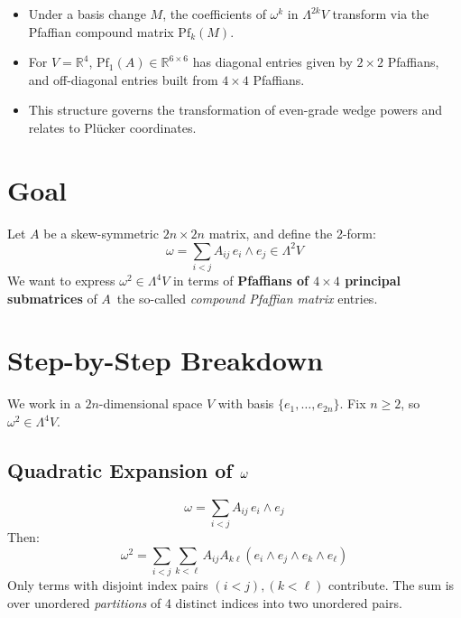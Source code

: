 \documentclass[aps,prd,onecolumn,notitlepage,nofootinbib]{revtex4-2}
\begin{document}
\begin{itemize}
\item Under a basis change $M$, the coefficients of $\omega ^{k}$ in $%
\Lambda ^{2k}V$ transform via the Pfaffian compound matrix $\mathrm{Pf}%
_{k}(M)$.

\item For $V=\mathbb{R}^{4}$, $\mathrm{Pf}_{1}(A)\in \mathbb{R}^{6\times 6}$
has diagonal entries given by $2\times 2$ Pfaffians, and off-diagonal
entries built from $4\times 4$ Pfaffians.

\item This structure governs the transformation of even-grade wedge powers
and relates to Pl\"{u}cker coordinates.
\end{itemize}

\section{Goal}

Let $A$ be a skew-symmetric $2n\times 2n$ matrix, and define the 2-form: 
\begin{equation*}
\omega =\sum_{i<j}A_{ij}\,e_{i}\wedge e_{j}\in \Lambda ^{2}V
\end{equation*}%
We want to express $\omega ^{2}\in \Lambda ^{4}V$ in terms of \textbf{%
Pfaffians of $4\times 4$ principal submatrices} of $A$\ the so-called \emph{%
compound Pfaffian matrix} entries.

\section{Step-by-Step Breakdown}

We work in a $2n$-dimensional space $V$ with basis $\{e_1, \dots, e_{2n}\}$.
Fix $n \geq 2$, so $\omega^2 \in \Lambda^4 V$.

\subsection{Quadratic Expansion of $\protect\omega$}

\begin{equation*}
\omega = \sum_{i<j} A_{ij} \, e_i \wedge e_j
\end{equation*}
Then: 
\begin{equation*}
\omega^2 = \sum_{i<j} \sum_{k<\ell} A_{ij} A_{k\ell} (e_i \wedge e_j \wedge
e_k \wedge e_\ell)
\end{equation*}
Only terms with disjoint index pairs $(i<j), (k<\ell)$ contribute. The sum
is over unordered \emph{partitions} of 4 distinct indices into two unordered
pairs.
\end{document}
